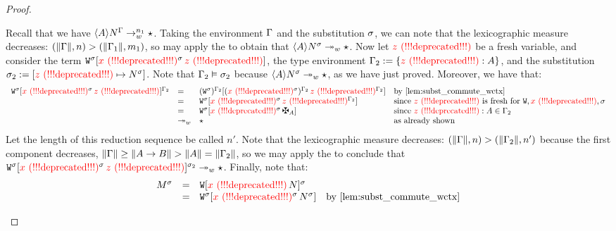\begin{proof}
\begin{enumerate}
\begin{enumerate}
    Recall that we have $\langle A\rangle N^{\Gamma} \to_{w}^{n_1} \star$.
    Taking the environment $\Gamma$ and the substitution $\sigma$,
    we can note that the lexicographic measure decreases:
    $(\lVert\Gamma\rVert,n) > (\lVert\Gamma_1\rVert,m_1)$,
    so may apply the \ih to obtain that
    $\langle A\rangle N^{\sigma} \twoheadrightarrow_{w} \star$.
    Now let $\textcolor{red}{z \text{\,\,(!!!deprecated!!!)}}$ be a fresh variable, and consider
    the term $\mathtt{W}^{\sigma}[\textcolor{red}{x \text{\,\,(!!!deprecated!!!)}}^{\sigma}\,\textcolor{red}{z \text{\,\,(!!!deprecated!!!)}}]$,
    the type environment $\Gamma_2 := \{\textcolor{red}{z \text{\,\,(!!!deprecated!!!)}}:A\}$,
    and the substitution $\sigma_2 := [\textcolor{red}{z \text{\,\,(!!!deprecated!!!)}}\mapsto N^{\sigma}]$.
    Note that $\Gamma_2\vDash\sigma_2$
    because $\langle A\rangle N^{\sigma} \twoheadrightarrow_{w} \star$, as we have
    just proved.
    Moreover, we have that:
    \[
      \begin{array}{rlll}
        \subs{\ctxof{\subs{\wctx}{\subst}}{\subs{\var}{\subst}\,\varthree}}{\tenv_2}
      & = &
        \ctxof{\subs{(\subs{\wctx}{\subst})}{\tenv_2}}{\subs{(\subs{\var}{\subst})}{\tenv_2}\,\subs{\varthree}{\tenv_2}}
        & \text{by \cref{lem:subst_commute_wctx}}
      \\
      & = &
        \ctxof{\subs{\wctx}{\subst}}{\subs{\var}{\subst}\,\subs{\varthree}{\tenv_2}}
        & \text{since $\varthree$ is fresh for $\wctx,\var,\subst$}
      \\
      & = &
        \ctxof{\subs{\wctx}{\subst}}{\subs{\var}{\subst}\,\gen{\typ}}
        & \text{since $\varthree : \typ \in \tenv_2$}
      \\
      & \tows &
        \iunit
        & \text{as already shown}
      \end{array}
    \]
    Let the length of this reduction sequence be called $n'$.
    Note that the lexicographic measure decreases:
    $(\lVert\Gamma\rVert,n) > (\lVert\Gamma_2\rVert,n')$
    because the first component decreases, \ie
    $\lVert\Gamma\rVert
     \geq \lVert A\to B\rVert
     > \lVert A\rVert
     = \lVert\Gamma_2\rVert$,
    so we may apply the \ih to conclude that
    $\mathtt{W}^{\sigma}[\textcolor{red}{x \text{\,\,(!!!deprecated!!!)}}^{\sigma}\,\textcolor{red}{z \text{\,\,(!!!deprecated!!!)}}]^{\sigma_2}
     \twoheadrightarrow_{w} \star$.
    Finally, note that:
    \[
      \begin{array}{rlll}
        \subs{\utm}{\subst}
      & = &
        \subs{\ctxof{\wctx}{\var\,\utmtwo}}{\subst}
      \\
      & = &
        \ctxof{\subs{\wctx}{\subst}}{\subs{\var}{\subst}\,\subs{\utmtwo}{\subst}}
        & \text{by \cref{lem:subst_commute_wctx}}
      \\

\end{array}\]
\end{enumerate}
\end{enumerate}
\end{proof}
